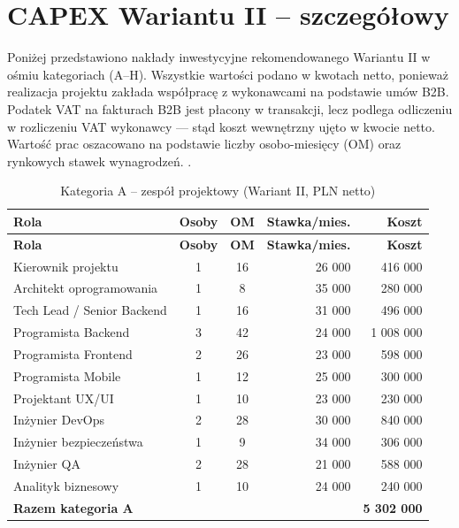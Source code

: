 \section{CAPEX Wariantu II -- szczegółowy}
\label{sec:capex_ii}

Poniżej przedstawiono nakłady inwestycyjne rekomendowanego Wariantu II w ośmiu kategoriach (A–H). Wszystkie wartości podano w kwotach netto, ponieważ realizacja projektu zakłada współpracę z wykonawcami na podstawie umów B2B. Podatek VAT na fakturach B2B jest płacony w transakcji, lecz podlega odliczeniu w rozliczeniu VAT wykonawcy — stąd koszt wewnętrzny ujęto w kwocie netto. Wartość prac oszacowano na podstawie liczby osobo-miesięcy (OM) oraz rynkowych stawek wynagrodzeń.  \cite{Hays_2026, NoFluffJobs_2025}.

\begin{longtable}{|L{5.0cm}|c|c|r|r|}
\caption{Kategoria A -- zespół projektowy (Wariant II, PLN netto)}
\label{tab:capex_zespol} \\
\hline
{}\textbf{Rola} & \textbf{Osoby} & \textbf{OM} & \textbf{Stawka/mies.} & \textbf{Koszt} \\
\hline
\endfirsthead
\hline
{}\textbf{Rola} & \textbf{Osoby} & \textbf{OM} & \textbf{Stawka/mies.} & \textbf{Koszt} \\
\hline
\endhead
Kierownik projektu & 1 & 16 & 26 000 & 416 000 \\
\hline
Architekt oprogramowania & 1 & 8 & 35 000 & 280 000 \\
\hline
Tech Lead / Senior Backend & 1 & 16 & 31 000 & 496 000 \\
\hline
Programista Backend & 3 & 42 & 24 000 & 1 008 000 \\
\hline
Programista Frontend & 2 & 26 & 23 000 & 598 000 \\
\hline
Programista Mobile & 1 & 12 & 25 000 & 300 000 \\
\hline
Projektant UX/UI & 1 & 10 & 23 000 & 230 000 \\
\hline
Inżynier DevOps & 2 & 28 & 30 000 & 840 000 \\
\hline
Inżynier bezpieczeństwa & 1 & 9 & 34 000 & 306 000 \\
\hline
Inżynier QA & 2 & 28 & 21 000 & 588 000 \\
\hline
Analityk biznesowy & 1 & 10 & 24 000 & 240 000 \\
\hline
{}\textbf{Razem kategoria A} & & & & \textbf{5 302 000} \\
\hline
\end{longtable}

